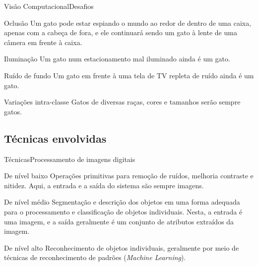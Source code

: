 \documentclass{beamer}
\begin{document}
    \begin{frame}{Visão Computacional}{Desafios}

        \begin{alertblock}{Oclusão}
            Um gato pode estar espiando o mundo ao redor de dentro de uma
            caixa, apenas com a cabeça de fora, e ele continuará sendo um gato à lente de uma câmera
            em frente à caixa.
        \end{alertblock}

        \begin{alertblock}{Iluminação}
            Um gato num estacionamento mal iluminado ainda é um gato.
        \end{alertblock}

        \begin{alertblock}{Ruído de fundo}
            Um gato em frente à uma tela de TV repleta de ruído
            ainda é um gato.
        \end{alertblock}

        \begin{alertblock}{Variações intra-classe}
            Gatos de diversas raças, cores e tamanhos serão
            sempre gatos.
        \end{alertblock}
    \end{frame}

    \subsection{Técnicas envolvidas}

        \begin{frame}{Técnicas}{Processamento de imagens digitais}
            \begin{block}{De nível baixo}
                Operações primitivas para remoção de ruídos, melhoria
                contraste e nitidez. Aqui, a entrada e a saída
                do sistema são sempre imagens.
            \end{block}
            \begin{block}{De nível médio}
                Segmentação e descrição dos objetos em uma forma 
                adequada para o processamento e classificação de objetos individuais.
                Nesta, a entrada é uma imagem, e a saída geralmente é um
                conjunto de atributos extraídos da imagem.
            \end{block}
            \begin{block}{De nível alto}
                Reconhecimento de objetos individuais,
                geralmente por meio de técnicas de reconhecimento de padrões (\emph{Machine Learning}). 
            \end{block}
        \end{frame}
\end{document}
